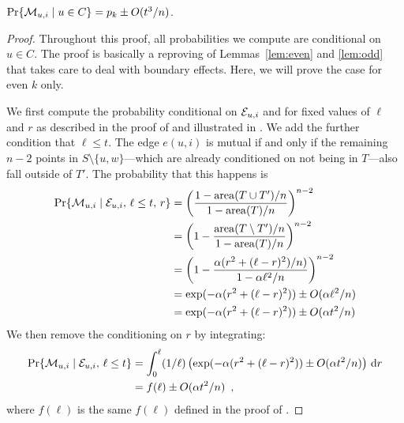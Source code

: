 \documentclass{patmorin}
\DeclareMathOperator{\area}{area}
\begin{document}
\begin{lem}
    $\Pr\{\mathcal{M}_{u,i}\mid u\in C\} = p_k\pm O(t^3/n)$.
\end{lem}

\begin{proof}
Throughout this proof, all probabilities we compute are conditional
on $u\in C$.
The proof is basically a reproving of Lemmas~\ref{lem:even} and
\ref{lem:odd} that takes care to deal with boundary effects.  Here,
we will prove the case for even $k$ only.

We first compute the probability conditional on $\mathcal{E}_{u,i}$ and for fixed
values of $\ell$ and $r$ as described in the proof of 
and illustrated in .  We add the further condition that
$\ell\le t$.  The edge $e(u,i)$ is mutual if and only if the remaining
$n-2$ points in $S\setminus\{u,w\}$---which are already conditioned on
not being in $T$---also fall outside of $T'$.  The probability that this
happens is
\begin{align*}
   \Pr\{\mui\mid\eui,\,\ell\le t,\, r\}
        & = \left(\frac{1-\area(T\cup T')/n}{1-\area(T)/n}\right)^{n-2} \\
        & = \left(1-\frac{\area(T\setminus T')/n}{1-\area(T)/n}\right)^{n-2} \\
        & = \left(1-\frac{\alpha(r^2+(\ell-r)^2)/n)}
                       {1-\alpha\ell^2/n}\right)^{n-2} \\
        & = \exp(-\alpha(r^2+(\ell-r)^2)) \pm O(\alpha\ell^2/n) \\
        & = \exp(-\alpha(r^2+(\ell-r)^2)) \pm O(\alpha t^2/n)
\end{align*}
We then remove the conditioning on $r$ by integrating:
\begin{align*}
   \Pr\{\mathcal{M}_{u,i}\mid\mathcal{E}_{u,i},\,\ell\le t\} 
     & = \int_0^\ell(1/\ell)\left(\exp(-\alpha(r^2+(\ell-r)^2)) 
           \pm O(\alpha t^2/n)\right)\,\mathrm{d}r \\
     & = f(\ell) \pm O(\alpha t^2/n) \enspace ,
\end{align*}
where $f(\ell)$ is the same $f(\ell)$ defined in the proof of .


\end{proof}
\end{document}
